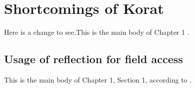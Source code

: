 \chapter{Shortcomings of Korat}
Here is a change to see.This is the main body of Chapter 1 \citep{Turing:Mind1950}.

\section{Usage of reflection for field access}
This is the main body of Chapter 1, Section 1, according to \citet{Godel:1940}.

